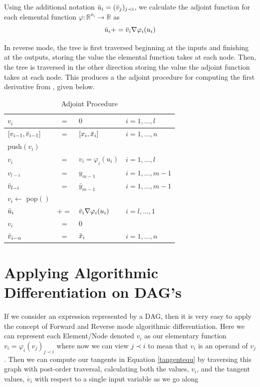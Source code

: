 \documentclass{article}
\begin{document}
Using the additional notation $\Bar{u}_i = (\Bar{v}_j)_{j \prec i}$, we calculate the adjoint function for each elemental function $\varphi : \mathbb{R}^{n_i} \longrightarrow \mathbb{R}$ as
\begin{equation}
    \Bar{u}_i += \Bar{v}_i \nabla \varphi_i (u_i)
\end{equation}

In reverse mode, the tree is first traversed beginning at the inputs and finishing at the outputs, storing the value the elemental function takes at each node. Then, the tree is traversed in the other direction storing the value the adjoint function takes at each node. This produces a the adjoint procedure for computing the first derivative from \cite{dhamarticle}, given below.

\begin{table}[h]
    \centering
    \begin{tabular}{|lcll|}
        \hline
        $v_{i}$ & $=$ & $0$ & $i = 1, \ldots, l$ \\
        \hline
        $[v_{i-1}, \Bar{v}_{i-1}]$ & $=$ & $[x_{i}, \Bar{x}_{i}]$ & $i = 1, \ldots, n$ \\
        \hline
        push$(v_i)$ & & & \\
        $v_{i}$ & $=$ & $v_i = \varphi_i (u_i)$ & $i = 1, \ldots, l$ \\
        \hline
        $v_{l-i}$ & $=$ & $y_{m-1}$ & $i = 1, \ldots, m-1$ \\
        $\Bar{v}_{l-i}$ & $=$ & $\bar{y}_{m-1}$ & $i = 1, \ldots, m-1$ \\
        \hline
        $v_i \leftarrow$ pop$()$ & & & \\
        $\Bar{u}_i$ & $+=$ & $\Bar{v}_i \nabla \varphi_i (u_i)$ & $i = l, \ldots, 1$ \\
        $v_i$ & $=$ & $0$ & \\
        \hline
        $\Bar{v}_{i-n}$ & $=$ & $\Bar{x}_i$ & $i = 1, \ldots, n$ \\
        \hline
    \end{tabular}
    \caption{Adjoint Procedure}
    \label{tab:ap}
\end{table}

\section{Applying Algorithmic Differentiation on DAG's}

If we consider an expression represented by a DAG, then it is very easy to apply the concept of Forward and Reverse mode algorithmic differentiation. Here we can represent each Element/Node denoted $v_i$ as our elementary function $v_i = \varphi_i (v_j)_{j \prec i}$ where now we can view $j \prec i$ to mean that $v_i$ is an operand of $v_j$. Then we can compute our tangents in Equation \ref{tangentequ} by traversing this graph with post-order traversal, calculating both the values, $v_i$, and the tangent values, $\Dot{v_i}$ with respect to a single input variable as we go along
\end{document}
